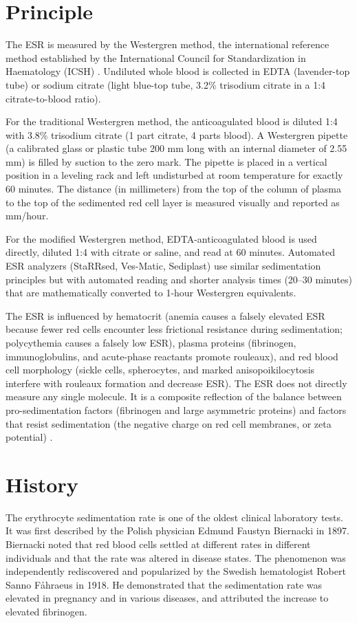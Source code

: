 \section*{Principle}
The ESR is measured by the Westergren method, the international reference method established by the International Council for Standardization in Haematology (ICSH) \cite{icsh2011icsh}. Undiluted whole blood is collected in EDTA (lavender-top tube) or sodium citrate (light blue-top tube, 3.2\% trisodium citrate in a 1:4 citrate-to-blood ratio).

For the traditional Westergren method, the anticoagulated blood is diluted 1:4 with 3.8\% trisodium citrate (1 part citrate, 4 parts blood). A Westergren pipette (a calibrated glass or plastic tube 200 mm long with an internal diameter of 2.55 mm) is filled by suction to the zero mark. The pipette is placed in a vertical position in a leveling rack and left undisturbed at room temperature for exactly 60 minutes. The distance (in millimeters) from the top of the column of plasma to the top of the sedimented red cell layer is measured visually and reported as mm/hour.

For the modified Westergren method, EDTA-anticoagulated blood is used directly, diluted 1:4 with citrate or saline, and read at 60 minutes. Automated ESR analyzers (StaRRsed, Ves-Matic, Sediplast) use similar sedimentation principles but with automated reading and shorter analysis times (20--30 minutes) that are mathematically converted to 1-hour Westergren equivalents.

The ESR is influenced by hematocrit (anemia causes a falsely elevated ESR because fewer red cells encounter less frictional resistance during sedimentation; polycythemia causes a falsely low ESR), plasma proteins (fibrinogen, immunoglobulins, and acute-phase reactants promote rouleaux), and red blood cell morphology (sickle cells, spherocytes, and marked anisopoikilocytosis interfere with rouleaux formation and decrease ESR). The ESR does not directly measure any single molecule. It is a composite reflection of the balance between pro-sedimentation factors (fibrinogen and large asymmetric proteins) and factors that resist sedimentation (the negative charge on red cell membranes, or zeta potential) \cite{tietz2023textbook}.

\section*{History}
The erythrocyte sedimentation rate is one of the oldest clinical laboratory tests. It was first described by the Polish physician Edmund Faustyn Biernacki in 1897. Biernacki noted that red blood cells settled at different rates in different individuals and that the rate was altered in disease states. The phenomenon was independently rediscovered and popularized by the Swedish hematologist Robert Sanno F{\aa}hraeus in 1918. He demonstrated that the sedimentation rate was elevated in pregnancy and in various diseases, and attributed the increase to elevated fibrinogen.

